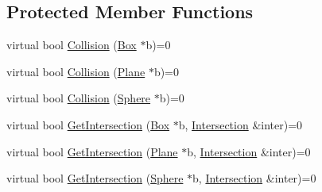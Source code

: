 \subsection*{Protected Member Functions}
\begin{DoxyCompactItemize}
\item 
virtual bool \hyperlink{class_agmd_physics_1_1_entities_ae1c765dffa486ba60f65a7a1040f1fa0}{Collision} (\hyperlink{class_agmd_physics_1_1_box}{Box} $\ast$b)=0
\item 
virtual bool \hyperlink{class_agmd_physics_1_1_entities_ae423e25abc42a8b29264dbdc578a1f04}{Collision} (\hyperlink{class_agmd_physics_1_1_plane}{Plane} $\ast$b)=0
\item 
virtual bool \hyperlink{class_agmd_physics_1_1_entities_af050c30f7d9d0f0d0c8c626b6bbf30d1}{Collision} (\hyperlink{class_agmd_physics_1_1_sphere}{Sphere} $\ast$b)=0
\item 
virtual bool \hyperlink{class_agmd_physics_1_1_entities_a73ae2e5855b40439457d8f714534c9d8}{Get\+Intersection} (\hyperlink{class_agmd_physics_1_1_box}{Box} $\ast$b, \hyperlink{struct_agmd_physics_1_1_intersection}{Intersection} \&inter)=0
\item 
virtual bool \hyperlink{class_agmd_physics_1_1_entities_a93bb118c33f74780a2b590bb0e435ee8}{Get\+Intersection} (\hyperlink{class_agmd_physics_1_1_plane}{Plane} $\ast$b, \hyperlink{struct_agmd_physics_1_1_intersection}{Intersection} \&inter)=0
\item 
virtual bool \hyperlink{class_agmd_physics_1_1_entities_ae8261cf4a7ce71634c8a59a3fb0e9495}{Get\+Intersection} (\hyperlink{class_agmd_physics_1_1_sphere}{Sphere} $\ast$b, \hyperlink{struct_agmd_physics_1_1_intersection}{Intersection} \&inter)=0
\end{DoxyCompactItemize}
